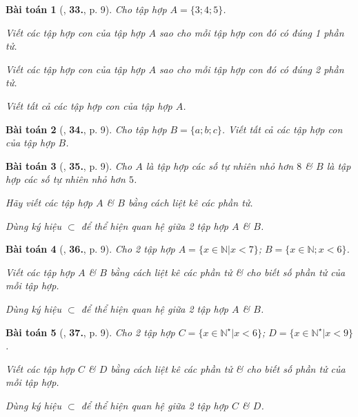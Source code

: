 \documentclass{article}
\numberwithin{equation}{section}
\newtheorem{baitoan}{Bài toán}[section]
\begin{document}
\begin{baitoan}[\cite{Trong_Toan_6_2021}, \textbf{33.}, p. 9]
	Cho tập hợp $A = \{3;4;5\}$.
	\begin{enumerate*}
		\item Viết các tập hợp con của tập hợp $A$ sao cho mỗi tập hợp con đó có đúng 1 phần tử.
		\item Viết các tập hợp con của tập hợp $A$ sao cho mỗi tập hợp con đó có đúng 2 phần tử.
		\item Viết tất cả các tập hợp con của tập hợp $A$.
	\end{enumerate*}
\end{baitoan}
	
\begin{baitoan}[\cite{Trong_Toan_6_2021}, \textbf{34.}, p. 9]
	Cho tập hợp $B = \{a;b;c\}$. Viết tất cả các tập hợp con của tập hợp $B$.		
\end{baitoan}

\begin{baitoan}[\cite{Trong_Toan_6_2021}, \textbf{35.}, p. 9]
	Cho $A$ là tập hợp các số tự nhiên nhỏ hơn $8$ \& $B$ là tập hợp các số tự nhiên nhỏ hơn $5$.
	\begin{enumerate*}
		\item Hãy viết các tập hợp $A$ \& $B$ bằng cách liệt kê các phần tử.
		\item Dùng ký hiệu $\subset$ để thể hiện quan hệ giữa 2 tập hợp $A$ \& $B$.
	\end{enumerate*}
\end{baitoan}

\begin{baitoan}[\cite{Trong_Toan_6_2021}, \textbf{36.}, p. 9]
	Cho 2 tập hợp $A = \{x\in\mathbb{N}|x < 7\}$; $B = \{x\in\mathbb{N};x < 6\}$.
	\begin{enumerate*}
		\item Viết các tập hợp $A$ \& $B$ bằng cách liệt kê các phần tử \& cho biết số phần tử của mỗi tập hợp.
		\item Dùng ký hiệu $\subset$ để thể hiện quan hệ giữa 2 tập hợp $A$ \& $B$.
	\end{enumerate*} 
\end{baitoan}

\begin{baitoan}[\cite{Trong_Toan_6_2021}, \textbf{37.}, p. 9]
	Cho 2 tập hợp $C = \{x\in\mathbb{N}^\star|x < 6\}$; $D = \{x\in\mathbb{N}^\star|x < 9\}$.
	\begin{enumerate*}
		\item Viết các tập hợp $C$ \& $D$ bằng cách liệt kê các phần tử \& cho biết số phần tử của mỗi tập hợp.
		\item Dùng ký hiệu $\subset$ để thể hiện quan hệ giữa 2 tập hợp $C$ \& $D$.
	\end{enumerate*} 
\end{baitoan}
\end{document}
